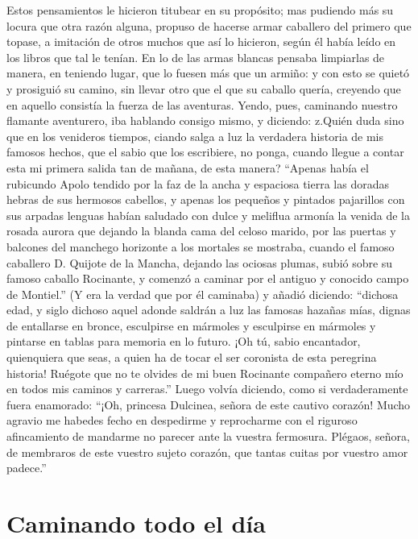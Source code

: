     Estos pensamientos le hicieron titubear en su propósito; mas
    pudiendo más su locura que otra razón alguna, propuso de hacerse
    armar caballero del primero que topase, a imitación de otros
    muchos que así lo hicieron, según él había leído en los libros que
    tal le tenían. En lo de las armas blancas pensaba limpiarlas de
    manera, en teniendo lugar, que lo fuesen más que un armiño: y con
    esto se quietó y prosiguió su camino, sin llevar otro que el que
    su caballo quería, creyendo que en aquello consistía la fuerza de
    las aventuras. Yendo, pues, caminando nuestro flamante aventurero,
    iba hablando consigo mismo, y diciendo: z.Quién duda sino que en
    los venideros tiempos, ciando salga a luz la verdadera historia de
    mis famosos hechos, que el sabio que los escribiere, no ponga,
    cuando llegue a contar esta mi primera salida tan de mañana, de
    esta manera? ``Apenas había el rubicundo Apolo tendido por la faz
    de la ancha y espaciosa tierra las doradas hebras de sus hermosos
    cabellos, y apenas los pequeños y pintados pajarillos con sus
    arpadas lenguas habían saludado con dulce y meliflua armonía la
    venida de la rosada aurora que dejando la blanda cama del celoso
    marido, por las puertas y balcones del manchego horizonte a los
    mortales se mostraba, cuando el famoso caballero D. Quijote de la
    Mancha, dejando las ociosas plumas, subió sobre su famoso caballo
    Rocinante, y comenzó a caminar por el antiguo y conocido campo de
    Montiel.'' (Y era la verdad que por él caminaba) y añadió diciendo:
    ``dichosa edad, y siglo dichoso aquel adonde saldrán a luz las
    famosas hazañas mías, dignas de entallarse en bronce, esculpirse
    en mármoles y esculpirse en mármoles y pintarse en tablas para
    memoria en lo futuro. ¡Oh tú, sabio encantador, quienquiera que
    seas, a quien ha de tocar el ser coronista de esta peregrina
    historia! Ruégote que no te olvides de mi buen Rocinante compañero
    eterno mío en todos mis caminos y carreras.'' Luego volvía
    diciendo, como si verdaderamente fuera enamorado: ``¡Oh, princesa
    Dulcinea, señora de este cautivo corazón! Mucho agravio me habedes
    fecho en despedirme y reprocharme con el riguroso afincamiento de
    mandarme no parecer ante la vuestra fermosura. Plégaos, señora, de
    membraros de este vuestro sujeto corazón, que tantas cuitas por
    vuestro amor padece.''
    
\section{Caminando todo el día}

